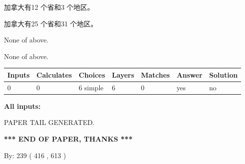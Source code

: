 \documentclass{ctexart}
\begin{document}
 
加拿大有12 个省和3 个地区。
 
 
加拿大有25 个省和31 个地区。
 
 
 None of above.
 
 
\noindent{}
 
 
 None of above.
 
 
\noindent{}
 
 
   
   
   
   
\noindent\begin{tabular}{|l|l|l|l|l|l|l|}
 \hline
Inputs & Calculates & Choices & Layers & Matches & Answer & Solution \\ \hline
 0  & 
 0  & 
 6
  simple  
  & 
 6  & 
 0  & 
  yes & 
  no 
  \\ \hline
 \end{tabular}
   
   
   
   
\noindent{}
   
   
   
   
\noindent\vspace{0.1in}\hspace{-0.08in} {\textbf{\Large{All inputs: }}}
   
   
   
   
   
   
 \vspace{0.2in}
 
   
   
\vspace{2.0in} PAPER TAIL GENERATED.
   
   
   
   
\vspace{1.0in} 
{\textbf{\large{ *** END OF PAPER, THANKS *** }}} 
   
   
\hspace{1.0in} By: 
 239 ( 416 ,  613 )
   
   
   
   
\newpage 
\setcounter{page}{ 
   417001 } 
   
   
   
\end{document}
